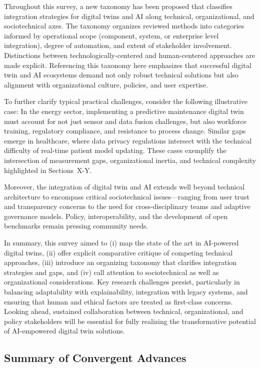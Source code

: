 \documentclass[sigconf]{acmart}
\begin{document}
Throughout this survey, a new taxonomy has been proposed that classifies integration strategies for digital twins and AI along technical, organizational, and sociotechnical axes. The taxonomy organizes reviewed methods into categories informed by operational scope (component, system, or enterprise level integration), degree of automation, and extent of stakeholder involvement. Distinctions between technologically-centered and human-centered approaches are made explicit. Referencing this taxonomy here emphasizes that successful digital twin and AI ecosystems demand not only robust technical solutions but also alignment with organizational culture, policies, and user expertise.

To further clarify typical practical challenges, consider the following illustrative case: In the energy sector, implementing a predictive maintenance digital twin must account for not just sensor and data fusion challenges, but also workforce training, regulatory compliance, and resistance to process change. Similar gaps emerge in healthcare, where data privacy regulations intersect with the technical difficulty of real-time patient model updating. These cases exemplify the intersection of measurement gaps, organizational inertia, and technical complexity highlighted in Sections~X-Y.

Moreover, the integration of digital twin and AI extends well beyond technical architecture to encompass critical sociotechnical issues—ranging from user trust and transparency concerns to the need for cross-disciplinary teams and adaptive governance models. Policy, interoperability, and the development of open benchmarks remain pressing community needs.

In summary, this survey aimed to (i) map the state of the art in AI-powered digital twins, (ii) offer explicit comparative critique of competing technical approaches, (iii) introduce an organizing taxonomy that clarifies integration strategies and gaps, and (iv) call attention to sociotechnical as well as organizational considerations. Key research challenges persist, particularly in balancing adaptability with explainability, integration with legacy systems, and ensuring that human and ethical factors are treated as first-class concerns. Looking ahead, sustained collaboration between technical, organizational, and policy stakeholders will be essential for fully realizing the transformative potential of AI-empowered digital twin solutions.

\subsection{Summary of Convergent Advances}
\end{document}
